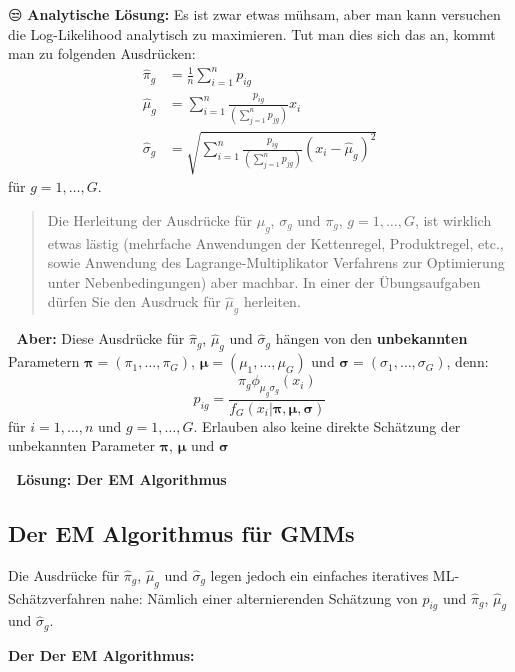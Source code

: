 \documentclass[
  ngerman,
]{book}
\begin{document}
😒 \textbf{Analytische Lösung:} Es ist zwar etwas mühsam, aber man kann versuchen die Log-Likelihood analytisch zu maximieren. Tut man dies sich das an, kommt man zu folgenden Ausdrücken:
\begin{align*}
\hat\pi_g&=\frac{1}{n}\sum_{i=1}^np_{ig}\\
\hat\mu_g&=\sum_{i=1}^n\frac{p_{ig}}{\left(\sum_{j=1}^np_{jg}\right)}x_i\\
\hat\sigma_g&=\sqrt{\sum_{i=1}^n\frac{p_{ig}}{\left(\sum_{j=1}^np_{jg}\right)}\left(x_i-\hat\mu_g\right)^2}
\end{align*}
für \(g=1,\dots,G\).

\begin{quote}
Die Herleitung der Ausdrücke für \(\mu_g\), \(\sigma_g\) und \(\pi_g\), \(g=1,\dots,G\), ist wirklich etwas lästig (mehrfache Anwendungen der Kettenregel, Produktregel, etc., sowie Anwendung des Lagrange-Multiplikator Verfahrens zur Optimierung unter Nebenbedingungen) aber machbar. In einer der Übungsaufgaben dürfen Sie den Ausdruck für \(\hat\mu_g\) herleiten.
\end{quote}

🙈 {\textbf{Aber:}} Diese Ausdrücke für \(\hat\pi_g\), \(\hat\mu_g\) und \(\hat\sigma_g\) hängen von den {\textbf{unbekannten}} Parametern \(\boldsymbol{\pi}=(\pi_1,\dots,\pi_G)\), \(\boldsymbol{\mu}=(\mu_1,\dots,\mu_G)\) und \(\boldsymbol{\sigma}=(\sigma_1,\dots,\sigma_G)\), denn:
\[
p_{ig}=\frac{\pi_g\phi_{\mu_g\sigma_g}(x_i)}{f_G(x_i|\boldsymbol{\pi},\boldsymbol{\mu},\boldsymbol{\sigma})}
\]
für \(i=1,\dots,n\) und \(g=1,\dots,G\). Erlauben also keine direkte Schätzung der unbekannten Parameter \(\boldsymbol{\pi}\), \(\boldsymbol{\mu}\) und \(\boldsymbol{\sigma}\)

🥳 {\textbf{Lösung: Der EM Algorithmus}}

\hypertarget{der-em-algorithmus-fuxfcr-gmms}{%
\subsection{Der EM Algorithmus für GMMs}\label{der-em-algorithmus-fuxfcr-gmms}}

Die Ausdrücke für \(\hat\pi_g\), \(\hat\mu_g\) und \(\hat\sigma_g\) legen jedoch ein einfaches iteratives ML-Schätzverfahren nahe: Nämlich einer alternierenden Schätzung von \(p_{ig}\) und \(\hat\pi_g\), \(\hat\mu_g\) und \(\hat\sigma_g\).

\textbf{Der Der EM Algorithmus:}
\end{document}
